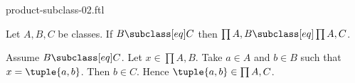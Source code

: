 \documentclass{article}
\begin{document}
\begin{smodule}[creators={Marcel Schütz}]{product-subclass-02.ftl}

  \begin{fproposition*}[label=4468848929538048]
    Let $A, B, C$ be classes.
    If $B \subclass[eq] C$ then $\prod{A,B} \subclass[eq] \prod{A,C}$.
  \end{fproposition*}
  \begin{fproof}
    Assume $B \subclass[eq] C$.
    Let $x \in \prod{A,B}$.
    Take $a \in A$ and $b \in B$ such that $x = \tuple{a,b}$.
    Then $b \in C$.
    Hence $\tuple{a,b} \in \prod{A,C}$.
  \end{fproof}
\end{smodule}
\end{document}
